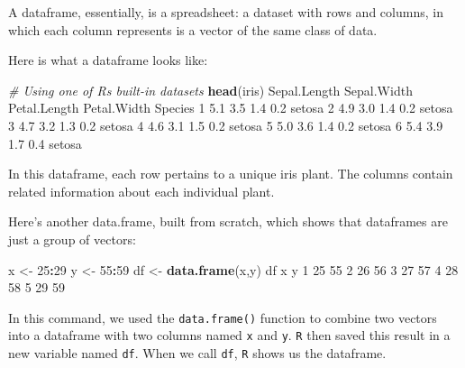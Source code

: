 \documentclass[
]{book}
\newenvironment{Shaded}{\begin{snugshade}}{\end{snugshade}}
\newcommand{\CommentTok}[1]{\textcolor[rgb]{0.56,0.35,0.01}{\textit{#1}}}
\newcommand{\DecValTok}[1]{\textcolor[rgb]{0.00,0.00,0.81}{#1}}
\newcommand{\FloatTok}[1]{\textcolor[rgb]{0.00,0.00,0.81}{#1}}
\newcommand{\FunctionTok}[1]{\textcolor[rgb]{0.13,0.29,0.53}{\textbf{#1}}}
\newcommand{\NormalTok}[1]{#1}
\newcommand{\OtherTok}[1]{\textcolor[rgb]{0.56,0.35,0.01}{#1}}
\newcommand{\SpecialCharTok}[1]{\textcolor[rgb]{0.81,0.36,0.00}{\textbf{#1}}}
\begin{document}
A dataframe, essentially, is a spreadsheet: a dataset with rows and columns, in which each column represents is a vector of the same class of data.

Here is what a dataframe looks like:

\begin{Shaded}
\begin{Highlighting}[]
\CommentTok{\# Using one of R\textquotesingle{}s built{-}in datasets}
\FunctionTok{head}\NormalTok{(iris)}
\NormalTok{  Sepal.Length Sepal.Width Petal.Length Petal.Width Species}
\DecValTok{1}          \FloatTok{5.1}         \FloatTok{3.5}          \FloatTok{1.4}         \FloatTok{0.2}\NormalTok{  setosa}
\DecValTok{2}          \FloatTok{4.9}         \FloatTok{3.0}          \FloatTok{1.4}         \FloatTok{0.2}\NormalTok{  setosa}
\DecValTok{3}          \FloatTok{4.7}         \FloatTok{3.2}          \FloatTok{1.3}         \FloatTok{0.2}\NormalTok{  setosa}
\DecValTok{4}          \FloatTok{4.6}         \FloatTok{3.1}          \FloatTok{1.5}         \FloatTok{0.2}\NormalTok{  setosa}
\DecValTok{5}          \FloatTok{5.0}         \FloatTok{3.6}          \FloatTok{1.4}         \FloatTok{0.2}\NormalTok{  setosa}
\DecValTok{6}          \FloatTok{5.4}         \FloatTok{3.9}          \FloatTok{1.7}         \FloatTok{0.4}\NormalTok{  setosa}
\end{Highlighting}
\end{Shaded}

In this dataframe, each row pertains to a unique iris plant. The columns contain related information about each individual plant.

Here's another data.frame, built from scratch, which shows that dataframes are just a group of vectors:

\begin{Shaded}
\begin{Highlighting}[]
\NormalTok{x }\OtherTok{\textless{}{-}} \DecValTok{25}\SpecialCharTok{:}\DecValTok{29}
\NormalTok{y }\OtherTok{\textless{}{-}} \DecValTok{55}\SpecialCharTok{:}\DecValTok{59}
\NormalTok{df }\OtherTok{\textless{}{-}} \FunctionTok{data.frame}\NormalTok{(x,y)}
\NormalTok{df}
\NormalTok{   x  y}
\DecValTok{1} \DecValTok{25} \DecValTok{55}
\DecValTok{2} \DecValTok{26} \DecValTok{56}
\DecValTok{3} \DecValTok{27} \DecValTok{57}
\DecValTok{4} \DecValTok{28} \DecValTok{58}
\DecValTok{5} \DecValTok{29} \DecValTok{59}
\end{Highlighting}
\end{Shaded}

In this command, we used the \texttt{data.frame()} function to combine two vectors into a dataframe with two columns named \texttt{x} and \texttt{y}. \texttt{R} then saved this result in a new variable named \texttt{df}. When we call \texttt{df}, \texttt{R} shows us the dataframe.
\end{document}
